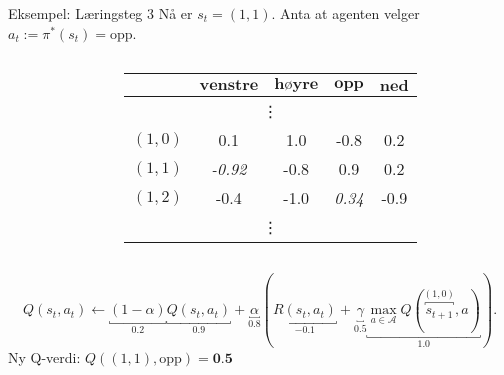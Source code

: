 \documentclass[UKenglish]{beamer}
\begin{document}
\begin{frame}{Eksempel: Læringsteg 3}
	Nå er $s_t=(1,1)$. Anta at agenten velger $a_t:=\pi^*(s_t)=\text{opp}$.
	\vspace{-1em}
	\begin{columns}
		\begin{column}{0.4\textwidth}
			\begin{center}
				
			\end{center}
		\end{column}
		\begin{column}{0.6\textwidth}%
			\begin{table}[!hbt]
				\centering
				\def\arraystretch{1.0}
				\setlength{}
				\begin{tabular}{|c|c|c|c|c|}\hline
					\diagbox{$\textbf{s}$}{$\textbf{a}$} & $\textbf{venstre}$ & $\textbf{høyre}$ & $\textbf{opp}$ & $\textbf{ned}$\\ \hline
					\multicolumn{5}{|c|}{\vdots} \\ \hline
					$(1,0)$ & 0.1 & 1.0 & -0.8 & 0.2 \\ \hline
					\rowcolor{orange!35}$(1,1)$ & \textit{-0.92} & -0.8 & \cellcolor{orange!70}0.9 & 0.2 \\ \hline
					$(1,2)$ & -0.4 & -1.0 & \textit{0.34} & -0.9 \\ \hline
					\multicolumn{5}{|c|}{\vdots}\\ \hline
				\end{tabular}
			\end{table}
		\end{column}
	\end{columns}		
	$$
	Q(s_t, a_t)\leftarrow\underbracket{(1-\alpha)}_{0.2}\underbracket{Q(s_t, a_t)}_{0.9}+\underbracket{\alpha}_{0.8}\left(\underbracket{R(s_t, a_t)}_{-0.1}+\underbracket{\gamma}_{0.5}\underbracket{\max_{a\in\mathcal{A}} Q(\overbracket{s_{t+1}}^{(1,0)}, a)}_{1.0}\right).
	$$
	Ny Q-verdi: $Q((1,1), \text{opp})=\textbf{0.5}$
\end{frame}
\end{document}
